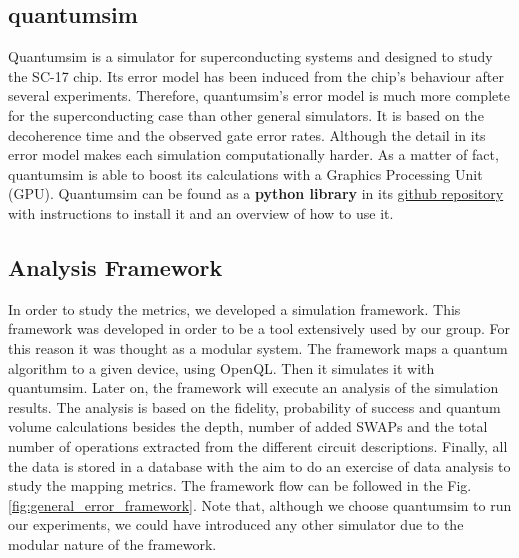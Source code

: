 \subsection{quantumsim}
\label{sec:org96b0d71}

Quantumsim \cite{O_Brien_2017} is a simulator for superconducting systems and designed to study the SC-17 chip.
Its error model has been induced from the chip's behaviour after several experiments.
Therefore, quantumsim's error model is much more complete for the superconducting case than other general simulators.
It is based on the decoherence time and the observed gate error rates.
Although the detail in its error model makes each simulation computationally harder.
As a matter of fact, quantumsim is able to boost its calculations with a Graphics Processing Unit (GPU).
Quantumsim can be found as a \textbf{python library} in its \href{https://github.com/quantumsim/quantumsim}{github repository} with instructions to install it and an overview of how to use it.

\subsection{Analysis Framework}
\label{sec:org60b7659}
In order to study the metrics, we developed a simulation framework.
This framework was developed in order to be a tool extensively used by our group.
For this reason it was thought as a modular system.
The framework maps a quantum algorithm to a given device, using OpenQL.
Then it simulates it with quantumsim.
Later on, the framework will execute an analysis of the simulation results.
The analysis is based on the fidelity, probability of success and quantum volume calculations besides the depth, number of added SWAPs and the total number of operations extracted from the different circuit descriptions.
Finally, all the data is stored in a database with the aim to do an exercise of data analysis to study the mapping metrics.
The framework flow can be followed in the Fig. \ref{fig:general_error_framework}.
Note that, although we choose quantumsim to run our experiments, we could have introduced any other simulator due to the modular nature of the framework.



